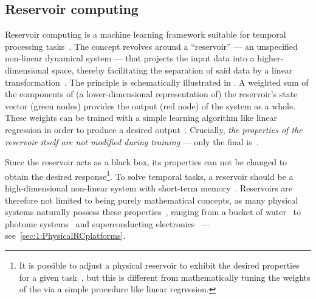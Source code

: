 \subsection{Reservoir computing}
Reservoir computing is a machine learning framework suitable for temporal processing tasks~\cite{BookReservoirComputing}.
The concept revolves around a ``reservoir'' --- an unspecified non-linear dynamical system --- that projects the input data into a higher-dimensional space, thereby facilitating the separation of said data by a linear transformation~\cite{appeltant2011information,KUR-24,RC_ASI}. %
The principle is schematically illustrated in .
A weighted sum of the components of (a lower-dimensional representation of) the reservoir's state vector (green nodes) provides the output (red node) of the system as a whole. %
These weights can be trained with a simple learning algorithm like linear regression in order to produce a desired output~\cite{RC_RecentAdvances, RC_SuperconductingElectronics}.
Crucially, \textit{the properties of the reservoir itself are not modified during training} --- only the final  is~\cite{RC_ASI,DynamicEmergence_NanomagneticSystem}. \par
Since the reservoir acts as a black box, its properties can not be changed to obtain the desired response\footnote{
	It is possible to adjust a physical reservoir to exhibit the desired properties for a given task~\cite{AdaptiveProgrammableRC,gartside2022reconfigurable}, but this is different from mathematically tuning the weights of the  via a simple procedure like linear regression.
}.
To solve temporal tasks, a reservoir should be a high-dimensional non-linear system with short-term memory~\cite{NeuromorphicAFMspintronics,RC_RecentAdvances}.
Reservoirs are therefore not limited to being purely mathematical concepts, as many physical systems naturally possess these properties~\cite{RC_DipoleNanomagnets,RC_PassiveFrustratedNM,RC_ASI,RC_RecentAdvances,NeuromorphicOscillators,VowelRecognition4STO,RC_DiffusiveMemristors,RC_MemristorTemporal,gartside2022reconfigurable}, ranging from a bucket of water~\cite{PatternRecognition_Bucket} to photonic systems~\cite{RC_Photonic} and superconducting electronics~\cite{RC_SuperconductingElectronics} --- see~\cref{sec:1:PhysicalRCplatforms}.
